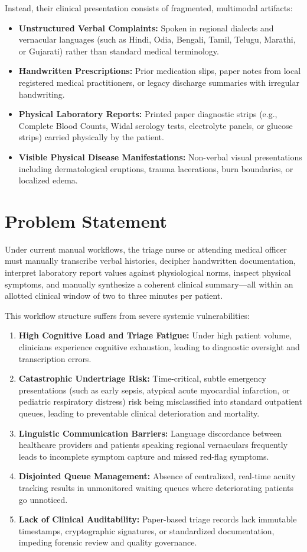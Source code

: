 \documentclass[11pt,a4paper,oneside]{report}
\begin{document}
Instead, their clinical presentation consists of fragmented, multimodal artifacts:
\begin{itemize}[leftmargin=20pt]
  \item \textbf{Unstructured Verbal Complaints:} Spoken in regional dialects and vernacular languages (such as Hindi, Odia, Bengali, Tamil, Telugu, Marathi, or Gujarati) rather than standard medical terminology.
  \item \textbf{Handwritten Prescriptions:} Prior medication slips, paper notes from local registered medical practitioners, or legacy discharge summaries with irregular handwriting.
  \item \textbf{Physical Laboratory Reports:} Printed paper diagnostic strips (e.g., Complete Blood Counts, Widal serology tests, electrolyte panels, or glucose strips) carried physically by the patient.
  \item \textbf{Visible Physical Disease Manifestations:} Non-verbal visual presentations including dermatological eruptions, trauma lacerations, burn boundaries, or localized edema.
\end{itemize}

\section{Problem Statement}
Under current manual workflows, the triage nurse or attending medical officer must manually transcribe verbal histories, decipher handwritten documentation, interpret laboratory report values against physiological norms, inspect physical symptoms, and manually synthesize a coherent clinical summary---all within an allotted clinical window of two to three minutes per patient.

This workflow structure suffers from severe systemic vulnerabilities:
\begin{enumerate}[leftmargin=20pt]
  \item \textbf{High Cognitive Load and Triage Fatigue:} Under high patient volume, clinicians experience cognitive exhaustion, leading to diagnostic oversight and transcription errors.
  \item \textbf{Catastrophic Undertriage Risk:} Time-critical, subtle emergency presentations (such as early sepsis, atypical acute myocardial infarction, or pediatric respiratory distress) risk being misclassified into standard outpatient queues, leading to preventable clinical deterioration and mortality.
  \item \textbf{Linguistic Communication Barriers:} Language discordance between healthcare providers and patients speaking regional vernaculars frequently leads to incomplete symptom capture and missed red-flag symptoms.
  \item \textbf{Disjointed Queue Management:} Absence of centralized, real-time acuity tracking results in unmonitored waiting queues where deteriorating patients go unnoticed.
  \item \textbf{Lack of Clinical Auditability:} Paper-based triage records lack immutable timestamps, cryptographic signatures, or standardized documentation, impeding forensic review and quality governance.
\end{enumerate}
\end{document}
